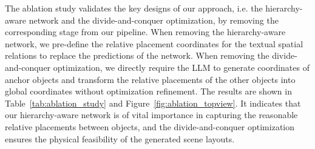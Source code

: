 The ablation study validates the key designs of our approach, i.e. the hierarchy-aware network and the divide-and-conquer optimization, by removing the corresponding stage from our pipeline. When removing the hierarchy-aware network, we pre-define the relative placement coordinates for the textual spatial relations to replace the predictions of the network. When removing the divide-and-conquer optimization, we directly require the LLM to generate coordinates of anchor objects and transform the relative placements of the other objects into global coordinates without optimization refinement. The results are shown in Table~\ref{tab:ablation_study} and Figure~\ref{fig:ablation_topview}. It indicates that our hierarchy-aware network is of vital importance in capturing the reasonable relative placements between objects, and the divide-and-conquer optimization ensures the physical feasibility of the generated scene layouts.

